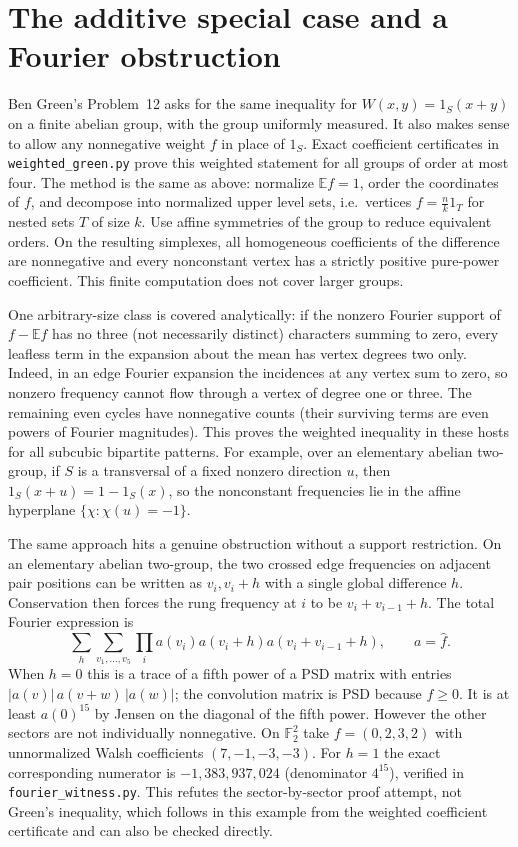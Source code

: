 \documentclass[11pt]{article}
\begin{document}
\section{The additive special case and a Fourier obstruction}
Ben Green's Problem~12 \cite{green} asks for the same inequality for $W(x,y)=1_S(x+y)$ on a finite abelian group, with the group uniformly measured. It also makes sense to allow any nonnegative weight $f$ in place of $1_S$. Exact coefficient certificates in \texttt{weighted\_green.py} prove this weighted statement for all groups of order at most four. The method is the same as above: normalize $\mathbb Ef=1$, order the coordinates of $f$, and decompose into normalized upper level sets, i.e.\ vertices $f=\frac{n}{k}1_T$ for nested sets $T$ of size $k$. Use affine symmetries of the group to reduce equivalent orders. On the resulting simplexes, all homogeneous coefficients of the difference are nonnegative and every nonconstant vertex has a strictly positive pure-power coefficient. This finite computation does not cover larger groups.

One arbitrary-size class is covered analytically: if the nonzero Fourier support of $f-\mathbb Ef$ has no three (not necessarily distinct) characters summing to zero, every leafless term in the expansion about the mean has vertex degrees two only. Indeed, in an edge Fourier expansion the incidences at any vertex sum to zero, so nonzero frequency cannot flow through a vertex of degree one or three. The remaining even cycles have nonnegative counts (their surviving terms are even powers of Fourier magnitudes). This proves the weighted inequality in these hosts for all subcubic bipartite patterns. For example, over an elementary abelian two-group, if $S$ is a transversal of a fixed nonzero direction $u$, then $1_S(x+u)=1-1_S(x)$, so the nonconstant frequencies lie in the affine hyperplane $\{\chi:\chi(u)=-1\}$.

The same approach hits a genuine obstruction without a support restriction. On an elementary abelian two-group, the two crossed edge frequencies on adjacent pair positions can be written as $v_i,v_i+h$ with a single global difference $h$. Conservation then forces the rung frequency at $i$ to be $v_i+v_{i-1}+h$. The total Fourier expression is
\[
 \sum_{h}\sum_{v_1,\ldots,v_5}
          \prod_i a(v_i)a(v_i+h)a(v_i+v_{i-1}+h),
 \qquad a=\widehat f .
\]
When $h=0$ this is a trace of a fifth power of a PSD matrix with entries $|a(v)|\,a(v+w)\,|a(w)|$; the convolution matrix is PSD because $f\ge0$. It is at least $a(0)^{15}$ by Jensen on the diagonal of the fifth power. However the other sectors are not individually nonnegative. On $\mathbb F_2^2$ take $f=(0,2,3,2)$ with unnormalized Walsh coefficients $(7,-1,-3,-3)$. For $h=1$ the exact corresponding numerator is $-1{,}383{,}937{,}024$ (denominator $4^{15}$), verified in \texttt{fourier\_witness.py}. This refutes the sector-by-sector proof attempt, not Green's inequality, which follows in this example from the weighted coefficient certificate and can also be checked directly.
\end{document}
